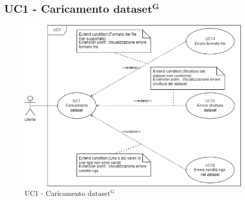 \subsection{UC1 - Caricamento ${\mathbf{dataset^{G}}}$ }
\begin{figure}[h!]
    \centering
    \includegraphics[scale=0.60]{../../assets/Caricamento_dataset.png}
    \caption{UC1 - Caricamento ${\mathrm{dataset^{G}}}$}
\end{figure}
